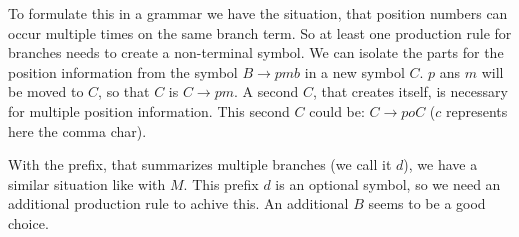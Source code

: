 \documentclass[a4paper,10pt]{article}
\begin{document}
To formulate this in a grammar we have the situation, that position numbers can occur multiple times on the same branch term. So at least one production rule for branches needs to create a non-terminal symbol. We can isolate the parts for the position information from the symbol $B \rightarrow pmb$ in a new symbol $C$. $p$ ans $m$ will be moved to $C$, so that $C$ is $C \rightarrow pm$. A second $C$, that creates itself, is necessary for multiple position information. This second $C$ could be: $C \rightarrow poC$ ($c$ represents here the comma char).

With the prefix, that summarizes multiple branches (we call it $d$), we have a similar situation like with $M$. This prefix $d$ is an optional symbol, so we need an additional production rule to achive this. An additional $B$ seems to be a good choice.
\end{document}
